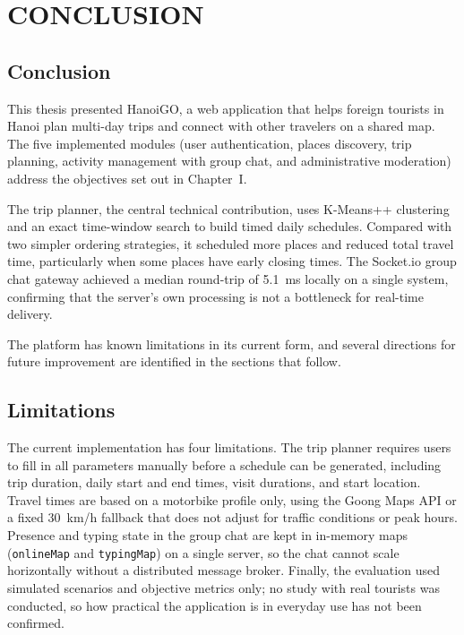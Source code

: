 \documentclass[a4paper,12pt]{report}
\begin{document}
\newpage
\setlength{\parindent}{15pt}
\setlength{\parskip}{0em}
\linespread{1}\selectfont

\chapter{CONCLUSION}\label{ch:conclusion}

\setlength{\parindent}{0pt}
\setlength{\parskip}{0.6em}
\linespread{1.3}\selectfont
\titlespacing*{\section}{0pt}{12pt}{4pt}

\section{Conclusion}

This thesis presented HanoiGO, a web application that helps foreign tourists in Hanoi plan multi-day trips and connect with other travelers on a shared map. The five implemented modules (user authentication, places discovery, trip planning, activity management with group chat, and administrative moderation) address the objectives set out in Chapter~I.

The trip planner, the central technical contribution, uses K-Means++ clustering and an exact time-window search to build timed daily schedules. Compared with two simpler ordering strategies, it scheduled more places and reduced total travel time, particularly when some places have early closing times. The Socket.io group chat gateway achieved a median round-trip of 5.1~ms locally on a single system, confirming that the server's own processing is not a bottleneck for real-time delivery.

The platform has known limitations in its current form, and several directions for future improvement are identified in the sections that follow.

\section{Limitations}

The current implementation has four limitations. The trip planner requires users to fill in all parameters manually before a schedule can be generated, including trip duration, daily start and end times, visit durations, and start location. Travel times are based on a motorbike profile only, using the Goong Maps API or a fixed 30~km/h fallback that does not adjust for traffic conditions or peak hours. Presence and typing state in the group chat are kept in in-memory maps (\texttt{onlineMap} and \texttt{typingMap}) on a single server, so the chat cannot scale horizontally without a distributed message broker. Finally, the evaluation used simulated scenarios and objective metrics only; no study with real tourists was conducted, so how practical the application is in everyday use has not been confirmed.
\end{document}
